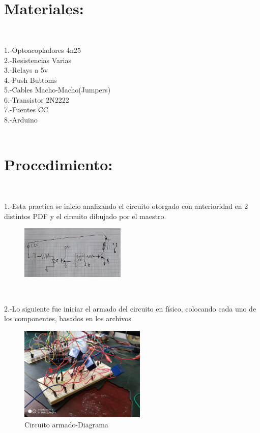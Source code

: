 \documentclass[12pt,letterpaper]{article}
\begin{document}
\ 


\

\section{Materiales:}
\

1.-Optoacopladores 4n25\\
2.-Resistencias Varias\\
3.-Relays a 5v\\
4.-Push Buttoms\\
5.-Cables Macho-Macho(Jumpers)\\
6.-Transistor 2N2222\\
7.-Fuentes CC\\
8.-Arduino\\

\

\newpage

\section{Procedimiento:}
\

1.-Esta practica se inicio analizando el circuito otorgado con anterioridad en 2 distintos PDF y el circuito dibujado por el maestro.
\
\begin{figure}[h!]
\begin{center}
\includegraphics[width=5cm]{C1.jpeg} 
\end{center}
\end{figure}


\

2.-Lo siguiente fue iniciar el armado del circuito en físico, colocando cada uno de los componentes, basados en los archivos
\
\begin{figure}[h!]
\begin{center}
\includegraphics[width=6cm]{Circuito 1.jpeg} 
\caption{Circuito armado-Diagrama}
\end{center}
\end{figure}
\end{document}
